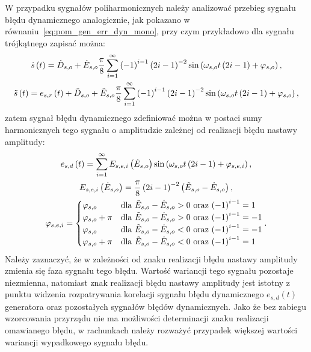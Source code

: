 W przypadku sygnałów poliharmonicznych należy analizować przebieg sygnału błędu dynamicznego analogicznie, jak pokazano w równaniu~\eqref{eq:pom_gen_err_dyn_mono}, przy czym przykładowo dla sygnału trójkątnego zapisać można:
\begin{gather}
\dot{s} \left(t\right) = \dot{D}_{s,o} + \dot{E}_{s,o} \frac{\pi}{8} \sum _{i=1} ^{\infty} \left(-1\right)^{i-1} \left(2i - 1\right)^{-2} \sin \left(\omega_{s,o} t \left(2i - 1\right) + \varphi_{s,o}\right) \label{eq:pom_gen_triangle_ideal}, \\
\tilde{s} \left(t\right) = e_{s,r} \left(t\right) + \tilde{D}_{s,o} + \tilde{E}_{s,o} \frac{\pi}{8} \sum _{i=1} ^{\infty} \left(-1\right)^{i-1} \left(2i - 1\right)^{-2} \sin \left(\omega_{s,o} t \left(2i - 1\right) + \varphi_{s,o}\right) \label{eq:pom_gen_triangle_real},
\end{gather}
zatem sygnał błędu dynamicznego zdefiniować można w postaci sumy harmonicznych tego sygnału o amplitudzie zależnej od realizacji błędu nastawy amplitudy:
\begin{gather}
e_{s,d} \emb{t} = \sum _{i=1} ^{\infty} E_{s,e,i} \emb{\dot{E}_{s,o}} \sin \emb{\omega_{s,o} t \emb{2i - 1} + \varphi_{s,e,i}} \label{eq:pom_gen_err_dyn_triangle}, \\
E_{s,e,i} \emb{\dot{E}_{s,o}} = \frac{\pi}{8} \emb{2i - 1}^{-2} \emb{\tilde{E}_{s,o} - \dot{E}_{s,o}} \label{eq:pom_gen_err_amp_triangle}, \\
\varphi_{s,e,i} =
\begin{cases}
\varphi_{s,o}       & $dla $ \tilde{E}_{s,o} - \dot{E}_{s,o} > 0 $ oraz $ \emb{-1}^{i-1} =  1 \\
\varphi_{s,o} + \pi & $dla $ \tilde{E}_{s,o} - \dot{E}_{s,o} > 0 $ oraz $ \emb{-1}^{i-1} = -1 \\
\varphi_{s,o}       & $dla $ \tilde{E}_{s,o} - \dot{E}_{s,o} < 0 $ oraz $ \emb{-1}^{i-1} = -1 \\
\varphi_{s,o} + \pi & $dla $ \tilde{E}_{s,o} - \dot{E}_{s,o} < 0 $ oraz $ \emb{-1}^{i-1} =  1
\end{cases}
\label{eq:pom_gen_err_phi_triangle}.
\end{gather}
Należy zaznaczyć, że w zależności od znaku realizacji błędu nastawy amplitudy zmienia się faza sygnału tego błędu. Wartość wariancji tego sygnału pozostaje niezmienna, natomiast znak realizacji błędu nastawy amplitudy jest istotny z punktu widzenia rozpatrywania korelacji sygnału błędu dynamicznego $e_{s,d}(t)$ generatora oraz pozostałych sygnałów błędów dynamicznych. Jako że bez zabiegu wzorcowania przyrządu nie ma możliwości determinacji znaku realizacji omawianego błędu, w rachunkach należy rozważyć przypadek większej wartości wariancji wypadkowego sygnału błędu.

